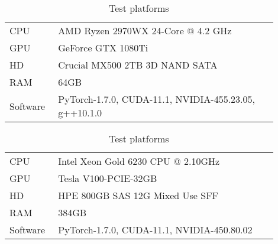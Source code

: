 \begin{table}
  \caption{Test platforms}
  \centering
  \begin{tabular}[t]{p{0.15\linewidth}p{0.75\linewidth}}
    \hline
    CPU      & AMD Ryzen 2970WX 24-Core @ 4.2 GHz                              \\
    GPU      & GeForce GTX 1080Ti                                              \\
    HD       & Crucial MX500 2TB 3D NAND SATA                                  \\
    RAM      & 64GB                                                            \\
    Software & PyTorch-1.7.0, CUDA-11.1, NVIDIA-455.23.05, g++10.1.0           \\
    \hline
  \end{tabular}
  \bigskip
  \begin{tabular}[t]{p{0.15\linewidth}p{0.75\linewidth}}
    \hline
    CPU      & Intel Xeon Gold 6230 CPU @ 2.10GHz                              \\
    GPU      & Tesla V100-PCIE-32GB                                            \\
    HD       & HPE 800GB SAS 12G Mixed Use SFF                                 \\
    RAM      & 384GB                                                           \\
    Software & PyTorch-1.7.0, CUDA-11.1, NVIDIA-450.80.02                      \\
    \hline
  \end{tabular}
  \label{tab:platforms}
\end{table}